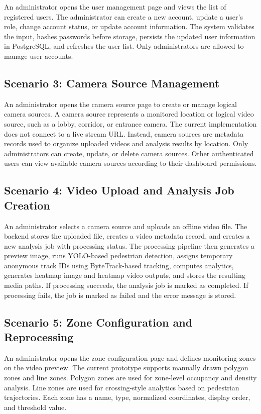 \documentclass[12pt,a4paper]{report}
\begin{document}
An administrator opens the user management page and views the list of registered users.
The administrator can create a new account, update a user's role, change account status, or update account information.
The system validates the input, hashes passwords before storage, persists the updated user information in PostgreSQL, and refreshes the user list.
Only administrators are allowed to manage user accounts.

\subsection*{Scenario 3: Camera Source Management}

An administrator opens the camera source page to create or manage logical camera sources.
A camera source represents a monitored location or logical video source, such as a lobby, corridor, or entrance camera.
The current implementation does not connect to a live stream URL.
Instead, camera sources are metadata records used to organize uploaded videos and analysis results by location.
Only administrators can create, update, or delete camera sources.
Other authenticated users can view available camera sources according to their dashboard permissions.

\subsection*{Scenario 4: Video Upload and Analysis Job Creation}

An administrator selects a camera source and uploads an offline video file.
The backend stores the uploaded file, creates a video metadata record, and creates a new analysis job with processing status.
The processing pipeline then generates a preview image, runs YOLO-based pedestrian detection, assigns temporary anonymous track IDs using ByteTrack-based tracking, computes analytics, generates heatmap image and heatmap video outputs, and stores the resulting media paths.
If processing succeeds, the analysis job is marked as completed.
If processing fails, the job is marked as failed and the error message is stored.

\subsection*{Scenario 5: Zone Configuration and Reprocessing}

An administrator opens the zone configuration page and defines monitoring zones on the video preview.
The current prototype supports manually drawn polygon zones and line zones.
Polygon zones are used for zone-level occupancy and density analysis.
Line zones are used for crossing-style analytics based on pedestrian trajectories.
Each zone has a name, type, normalized coordinates, display order, and threshold value.
\end{document}
